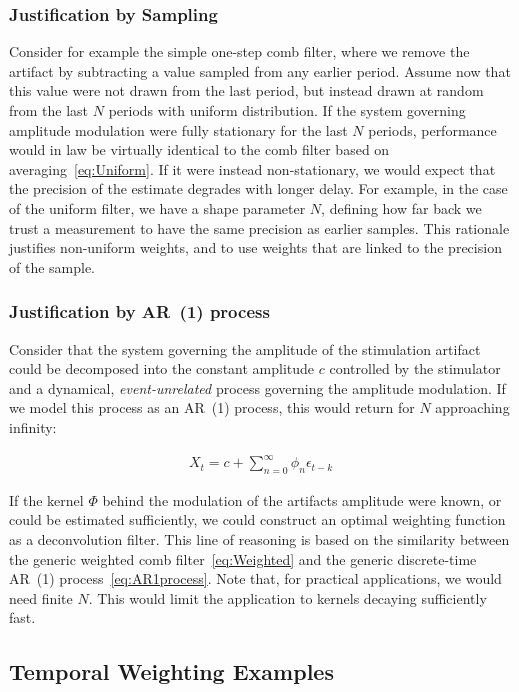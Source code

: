 \documentclass[a4paper]{article}
\begin{document}
\subsubsection{Justification by Sampling}
Consider for example the simple one-step comb filter, where we remove the artifact by subtracting a value sampled from any earlier period.
Assume now that this value were not drawn from the last period, but instead drawn at random from the last $N$ periods with uniform distribution. If the system governing amplitude modulation were fully stationary for the last $N$ periods, performance would in law be virtually identical to the comb filter based on averaging~\eqref{eq:Uniform}.
If it were instead non-stationary, we would expect that the precision of the estimate degrades with longer delay. For example, in the case of the uniform filter, we have a shape parameter $N$, defining how far back we trust a measurement to have the same precision as earlier samples. This rationale justifies non-uniform weights, and to use weights that are linked to the precision of the sample.

\subsubsection{Justification by AR~(1) process}

Consider that the system governing the amplitude of the stimulation artifact could be decomposed into the constant amplitude $c$ controlled by the stimulator and a dynamical, \emph{event-unrelated} process governing the amplitude modulation. If we model this process as an AR~(1) process, this would return for $N$ approaching infinity:

\begin{align}
    X_{t} = c + \sum_{n=0}^{\infty} \phi_n \epsilon_{t-k}\label{eq:AR1process}
\end{align}

If the kernel $\Phi$  behind the modulation of the artifacts amplitude were known, or could be estimated sufficiently, we could construct an optimal weighting function as a deconvolution filter.
This line of reasoning is based on the similarity between the generic weighted comb filter~\eqref{eq:Weighted} and the generic discrete-time AR~(1) process~\eqref{eq:AR1process}.
Note that, for practical applications, we would need finite $N$. This would limit the application to kernels decaying sufficiently fast.

\subsection{Temporal Weighting Examples}
\end{document}

